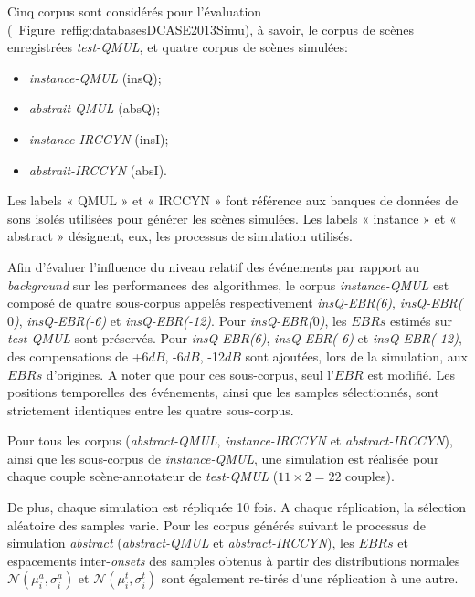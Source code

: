 Cinq corpus sont considérés pour l'évaluation (\cf~Figure~ref{fig:databasesDCASE2013Simu}), à savoir, le corpus de scènes enregistrées \emph{test-QMUL}, et quatre corpus de scènes simulées:

\begin{itemize}
\item \emph{instance-QMUL} (insQ);
\item \emph{abstrait-QMUL} (absQ);
\item \emph{instance-IRCCYN} (insI);
\item \emph{abstrait-IRCCYN} (absI).
\end{itemize}

Les labels « QMUL » et « IRCCYN » font référence aux banques de données de sons isolés utilisées pour générer les scènes simulées. Les labels « instance » et « abstract » désignent, eux, les processus de simulation utilisés. 

Afin d'évaluer l'influence du niveau relatif des événements par rapport au \emph{background} sur les performances des algorithmes, le corpus \emph{instance-QMUL} est composé de quatre sous-corpus appelés respectivement \emph{insQ-EBR(6)}, \emph{insQ-EBR($0$)}, \emph{insQ-EBR(-6)} et \emph{insQ-EBR(-12)}. Pour \emph{insQ-EBR($0$)}, les $EBRs$ estimés sur \emph{test-QMUL} sont préservés.  Pour \emph{insQ-EBR(6)}, \emph{insQ-EBR(-6)} et \emph{insQ-EBR(-12)}, des compensations de +6$dB$, -6$dB$, -12$dB$ sont ajoutées, lors de la simulation, aux $EBRs$ d'origines. A noter que pour ces sous-corpus, seul l'$EBR$ est modifié. Les positions temporelles des événements, ainsi que les samples sélectionnés, sont strictement identiques entre les quatre sous-corpus.

Pour tous les corpus (\emph{abstract-QMUL}, \emph{instance-IRCCYN} et \emph{abstract-IRCCYN}), ainsi que les sous-corpus de \emph{instance-QMUL}, une simulation est réalisée pour chaque couple scène-annotateur de \emph{test-QMUL} ($11\times2=22$ couples). 

De plus, chaque simulation est répliquée 10 fois. A chaque réplication, la sélection aléatoire des samples varie. Pour les corpus générés suivant le processus de simulation \emph{abstract} (\emph{abstract-QMUL} et \emph{abstract-IRCCYN}), les $EBRs$ et espacements inter-\emph{onsets} des samples obtenus à partir des distributions normales  $\mathcal{N}(\mu_i^a,\sigma_i^a)$ et $\mathcal{N}(\mu_i^t,\sigma_i^t)$ sont également re-tirés d'une réplication à une autre. 


